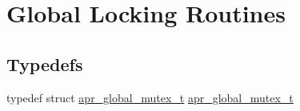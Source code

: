 \hypertarget{group___a_p_r___global_mutex}{}\section{Global Locking Routines}
\label{group___a_p_r___global_mutex}
\subsection*{Typedefs}
\begin{DoxyCompactItemize}
\item 
typedef struct \hyperlink{group___a_p_r___global_mutex_ga3fc7dc5b076533ee566aa4888ac35ee7}{apr\+\_\+global\+\_\+mutex\+\_\+t} \hyperlink{group___a_p_r___global_mutex_ga3fc7dc5b076533ee566aa4888ac35ee7}{apr\+\_\+global\+\_\+mutex\+\_\+t}
\end{DoxyCompactItemize}
